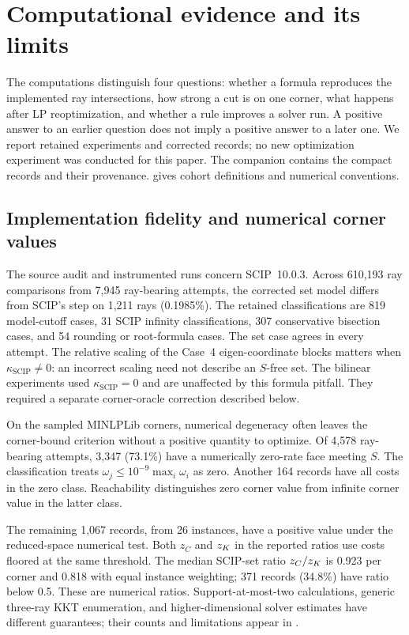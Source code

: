 \section{Computational evidence and its limits}
\label{exp:computation}
\label{exp:section}

The computations distinguish four questions: whether a formula reproduces
the implemented ray intersections, how strong a cut is on one corner,
what happens after LP reoptimization, and whether a rule improves a solver
run. A positive answer to an earlier question does not imply a positive
answer to a later one. We report retained experiments and corrected
records; no new optimization experiment was conducted for this paper.
The companion contains the compact records and their provenance.
 gives cohort definitions and numerical conventions.

\subsection{Implementation fidelity and numerical corner values}
\label{exp:fidelity}

The source audit and instrumented runs concern SCIP~10.0.3. Across
610,193 ray comparisons from 7,945 ray-bearing attempts, the corrected
set model differs from SCIP's step on 1,211 rays (0.1985\%). The retained
classifications are 819 model-cutoff cases, 31 SCIP infinity classifications,
307 conservative bisection cases, and 54 rounding or root-formula cases.
The set case agrees in every attempt. The relative scaling of the
Case~4 eigen-coordinate blocks matters when
$\kappa_{\mathrm{SCIP}}\ne0$: an incorrect scaling need not describe
an $S$-free set. The bilinear experiments used
$\kappa_{\mathrm{SCIP}}=0$ and are unaffected by this formula pitfall.
They required a separate corner-oracle correction described below.

On the sampled MINLPLib corners, numerical degeneracy often leaves the
corner-bound criterion without a positive quantity to optimize. Of 4,578
ray-bearing attempts, 3,347 (73.1\%) have a numerically zero-rate face
meeting $S$. The classification treats
$\omega_j\le10^{-9}\max_i\omega_i$ as zero. Another 164 records have
all costs in the zero class. Reachability distinguishes zero corner value
from infinite corner value in the latter class.

The remaining 1,067 records, from 26 instances, have a positive value
under the reduced-space numerical test. Both $z_C$ and $z_K$ in the
reported ratios use costs floored at the same threshold. The median
SCIP-set ratio $z_C/z_K$ is 0.923 per corner
and 0.818 with equal instance weighting; 371 records (34.8\%) have ratio
below 0.5. These are numerical ratios. Support-at-most-two calculations,
generic three-ray KKT enumeration, and higher-dimensional solver estimates
have different guarantees; their counts and limitations appear in
.

